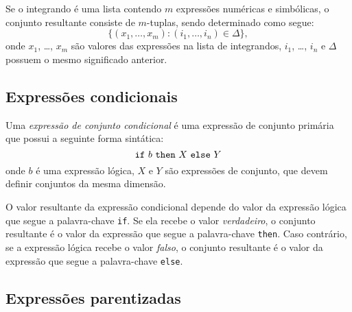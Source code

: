 \documentclass[11pt, brazil]{report}
\begin{document}
Se o integrando é uma lista contendo $m$ expressões numéricas e simbólicas,
o conjunto resultante consiste de $m$-tuplas, sendo determinado
como segue:
$$\{(x_1,\dots,x_m):(i_1,\dots,i_n)\in\Delta\},$$
onde $x_1$, \dots, $x_m$ são valores das expressões na lista
de integrandos, $i_1$, \dots, $i_n$ e $\Delta$ possuem o mesmo significado
anterior.


\subsection{Expressões condicionais}

Uma {\it expressão de conjunto condicional} é uma expressão de conjunto
primária que possui a seguinte forma sintática:
$$\mbox{{\tt if} $b$ {\tt then} $X$ {\tt else} $Y$}$$
onde $b$ é uma expressão lógica, $X$ e $Y$ são expressões de conjunto,
que devem definir conjuntos da mesma dimensão.


O valor resultante da expressão condicional depende do valor da
expressão lógica que segue a palavra-chave {\tt if}. Se ela recebe
o valor {\it verdadeiro}, o conjunto resultante é o valor da expressão
que segue a palavra-chave {\tt then}. Caso contrário, se a
expressão lógica recebe o valor {\it falso}, o conjunto resultante é
o valor da expressão que segue a palavra-chave {\tt else}.


\subsection{Expressões parentizadas}
\end{document}
